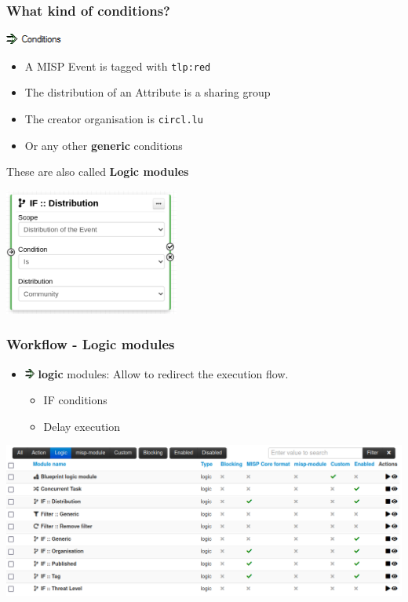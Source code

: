 \begin{frame}
    \frametitle{What kind of conditions?}
    \vspace*{0.25em}
    \includegraphics[width=70px]{pictures/sc-condition.png}
    \vspace*{0.25em}
    \begin{itemize}
        \item A MISP Event is tagged with \texttt{tlp:red}
        \item The distribution of an Attribute is a sharing group
        \item The creator organisation is \texttt{circl.lu}
        \item Or any other \textbf{generic} conditions
    \end{itemize}

    \vspace*{0.5em}
    {\Large {}} These are also called \textbf{Logic modules}
    \begin{center}
        \includegraphics[width=0.43\textwidth]{pictures/logic-module.png}
    \end{center}
\end{frame}

\begin{frame}
    \frametitle{Workflow - Logic modules}
    \begin{itemize}
        \item \includegraphics[width=12px]{pictures/sc-condition-icon.png} \textbf{logic} modules: Allow to redirect the execution flow.
        \begin{itemize}
            \item IF conditions
            \item Delay execution
        \end{itemize}
    \end{itemize}
    \begin{center}
        \includegraphics[width=1.0\linewidth]{pictures/logic-module-index.png}
    \end{center}
\end{frame}

